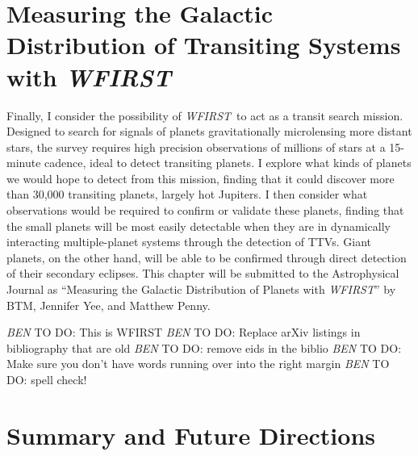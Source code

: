 \documentclass[12pt]{caltech_thesis}
\newcommand{\todo}[3]{{\color{#2} \emph{#1} TO DO: #3}}
\newcommand{\btmtodo}[1]{\todo{BEN}{red}{#1}}
\newcommand{\WF}{{\textit {WFIRST}}}
\begin{document}


\chapter{Measuring the Galactic Distribution of Transiting Systems with \WF}
\label{chap:wfirst}
Finally, I consider the possibility of \WF\ to act as a transit search mission.
Designed to search for signals of planets gravitationally microlensing more distant stars, the survey
requires high precision observations of millions of stars at a 15-minute cadence, ideal to detect
transiting planets.
I explore what kinds of planets we would hope to detect from this mission, finding that it could discover more than 30,000
transiting planets, largely hot Jupiters.
I then consider what observations would be required to confirm or validate these planets, finding that the small planets
will be most easily detectable when they are in dynamically interacting multiple-planet systems through the detection of
TTVs.
Giant planets, on the other hand, will be able to be confirmed through direct detection of their secondary eclipses.
This chapter will be submitted to the Astrophysical Journal as ``Measuring the Galactic Distribution of Planets with \WF'' by
BTM, Jennifer Yee, and Matthew Penny.





\btmtodo{This is WFIRST}
\btmtodo{Replace arXiv listings in bibliography that are old}
\btmtodo{remove eids in the biblio}
\btmtodo{Make sure you don't have words running over into the right margin}
\btmtodo{spell check!}


\chapter{Summary and Future Directions}
\label{chap:summary}

%



\printbibliography[]
%





\end{document}
